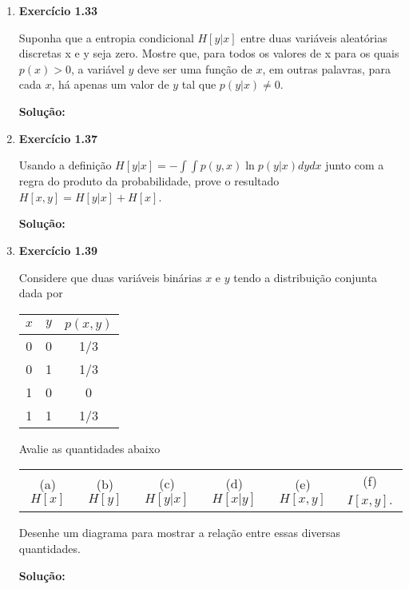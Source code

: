 \begin{enumerate}
Considere duas variáveis $x$ e $y$ com distribuição conjunta $p(x, y)$. Mostre que a entropia diferencial desse par de variáveis satisfaz
\begin{equation*}
    H[x,y] \leq H[x] + H[y]
\end{equation*}
com igualdade se, e somente se, $x$ e $y$ forem estatisticamente independentes.
\newline \par
\textbf{Solução:}

\item \textbf{Exercício 1.33} \par

Suponha que a entropia condicional $H[y|x]$ entre duas variáveis aleatórias discretas x e y seja zero. Mostre que, para todos os valores de x para os quais $p(x) > 0$, a variável $y$ deve ser uma função de $x$, em outras palavras, para cada $x$, há apenas um valor de $y$ tal que $p(y|x) \neq 0$.
\newline \par
\textbf{Solução:}

\item \textbf{Exercício 1.37} \par

Usando a definição $H[y|x] = - \int \int p(y,x) \ln p(y|x) dy dx$ junto com a regra do produto da probabilidade, prove o resultado $H[x,y] = H[y|x] + H[x]$. 
\newline \par
\textbf{Solução:}

\item \textbf{Exercício 1.39} \par

Considere que duas variáveis binárias $x$ e $y$ tendo a distribuição conjunta dada por
\begin{center}
    \begin{tabular}{|c|c|c|}
    \hline
    $x$ & $y$ & $p(x, y)$ \\
    \hline
    0 & 0 & 1/3\\
    \hline
    0 & 1 & 1/3\\
    \hline
    1 & 0 & 0\\
    \hline
    1 & 1 & 1/3\\
    \hline
    \end{tabular}
\end{center}
Avalie as quantidades abaixo
\begin{center}
    \begin{tabular}{c c c c c c}
     (a)$H[x]$ & (b)$H[y]$ & (c)$H[y|x]$ & (d)$H[x|y]$ & (e)$H[x,y]$ & (f)$I[x,y]$. \\
    \end{tabular}
\end{center}
Desenhe um diagrama para mostrar a relação entre essas diversas quantidades.
\newline \par
\textbf{Solução:}


\end{enumerate}
